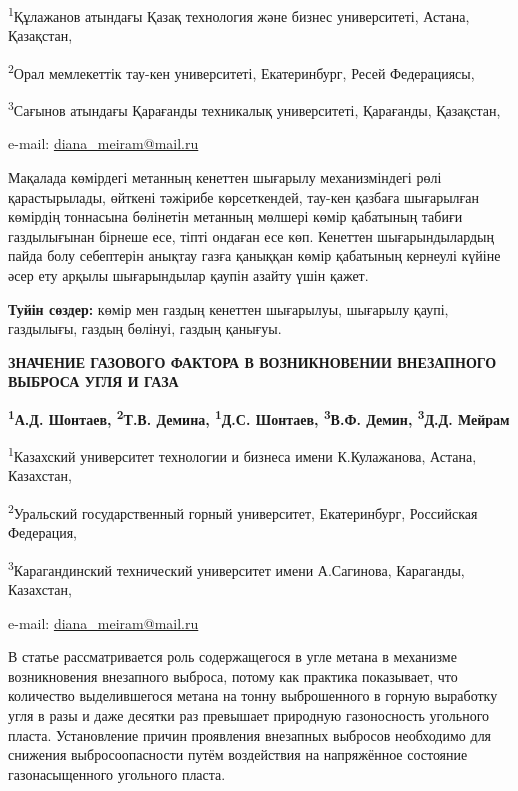 \begin{affiliation}
\textsuperscript{1}Құлажанов атындағы Қазақ технология және бизнес университеті, Астана, Қазақстан,

\textsuperscript{2}Орал мемлекеттік тау-кен университеті, Екатеринбург, Ресей Федерациясы,

\textsuperscript{3}Сағынов атындағы Қарағанды техникалық университеті, Қарағанды, Қазақстан,

e-mail: \href{mailto:baiz76@mail.ru}{diana\_meiram@mail.ru}
\end{affiliation}

Мақалада көмірдегі метанның кенеттен шығарылу механизміндегі рөлі
қарастырылады, өйткені тәжірибе көрсеткендей, тау-кен қазбаға шығарылған
көмірдің тоннасына бөлінетін метанның мөлшері көмір қабатының табиғи
газдылығынан бірнеше есе, тіпті ондаған есе көп. Кенеттен
шығарындылардың пайда болу себептерін анықтау газға қаныққан көмір
қабатының кернеулі күйіне әсер ету арқылы шығарындылар қаупін азайту
үшін қажет.

{\bfseries Туйін сөздер:} көмір мен газдың кенеттен шығарылуы, шығарылу
қаупі, газдылығы, газдың бөлінуі, газдың қанығуы.

\begin{articleheader}
{\bfseries ЗНАЧЕНИЕ ГАЗОВОГО ФАКТОРА В ВОЗНИКНОВЕНИИ ВНЕЗАПНОГО ВЫБРОСА УГЛЯ И ГАЗА}

{\bfseries
\textsuperscript{1}А.Д. Шонтаев,
\textsuperscript{2}Т.В. Демина,
\textsuperscript{1}Д.С. Шонтаев,
\textsuperscript{3}В.Ф. Демин,
\textsuperscript{3}Д.Д. Мейрам\textsuperscript{\envelope }
}
\end{articleheader}

\begin{affiliation}
\textsuperscript{1}Казахский университет технологии и бизнеса имени К.Кулажанова, Астана, Казахстан,

\textsuperscript{2}Уральский государственный горный университет, Екатеринбург, Российская Федерация,

\textsuperscript{3}Карагандинский технический университет имени А.Сагинова, Караганды, Казахстан,

e-mail: \href{mailto:baiz76@mail.ru}{diana\_meiram@mail.ru}
\end{affiliation}

В статье рассматривается роль содержащегося в угле метана в механизме
возникновения внезапного выброса, потому как практика показывает, что
количество выделившегося метана на тонну выброшенного в горную выработку
угля в разы и даже десятки раз превышает природную газоносность
угольного пласта. Установление причин проявления внезапных выбросов
необходимо для снижения выбросоопасности путём воздействия на
напряжённое состояние газонасыщенного угольного пласта.

